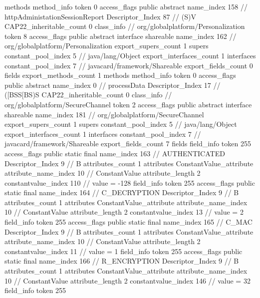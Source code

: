 {{{			methods {
				method_info {
					token	0
					access_flags	public abstract
					name_index	158		// httpAdministationSessionReport
					Descriptor_Index	87		// (S)V
				}
			}
			CAP22_inheritable_count	0
		}
		class_info {		// org/globalplatform/Personalization
			token	8
			access_flags	public abstract interface shareable
			name_index	162		// org/globalplatform/Personalization
			export_supers_count	1
			supers {
				constant_pool_index	5		// java/lang/Object
			}
			export_interfaces_count	1
			interfaces {
				constant_pool_index	7		// javacard/framework/Shareable
			}
			export_fields_count	0
			fields {
			}
			export_methods_count	1
			methods {
				method_info {
					token	0
					access_flags	public abstract
					name_index	0		// processData
					Descriptor_Index	17		// ([BSS[BS)S
				}
			}
			CAP22_inheritable_count	0
		}
		class_info {		// org/globalplatform/SecureChannel
			token	2
			access_flags	public abstract interface shareable
			name_index	181		// org/globalplatform/SecureChannel
			export_supers_count	1
			supers {
				constant_pool_index	5		// java/lang/Object
			}
			export_interfaces_count	1
			interfaces {
				constant_pool_index	7		// javacard/framework/Shareable
			}
			export_fields_count	7
			fields {
			field_info {
				token	255
				access_flags	public static final
				name_index	163		// AUTHENTICATED
				Descriptor_Index	9		// B
				attributes_count	1
				attributes {
				ConstantValue_attribute {
					attribute_name_index	10		// ConstantValue
					attribute_length	2
					constantvalue_index	110		// value = -128
				}
				}
			}
			field_info {
				token	255
				access_flags	public static final
				name_index	164		// C_DECRYPTION
				Descriptor_Index	9		// B
				attributes_count	1
				attributes {
				ConstantValue_attribute {
					attribute_name_index	10		// ConstantValue
					attribute_length	2
					constantvalue_index	13		// value = 2
				}
				}
			}
			field_info {
				token	255
				access_flags	public static final
				name_index	165		// C_MAC
				Descriptor_Index	9		// B
				attributes_count	1
				attributes {
				ConstantValue_attribute {
					attribute_name_index	10		// ConstantValue
					attribute_length	2
					constantvalue_index	11		// value = 1
				}
				}
			}
			field_info {
				token	255
				access_flags	public static final
				name_index	166		// R_ENCRYPTION
				Descriptor_Index	9		// B
				attributes_count	1
				attributes {
				ConstantValue_attribute {
					attribute_name_index	10		// ConstantValue
					attribute_length	2
					constantvalue_index	146		// value = 32
				}
				}
			}
			field_info {
				token	255
}}}}}
